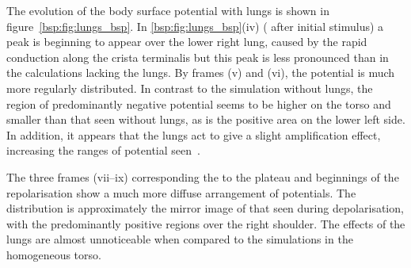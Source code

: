 The evolution of the body surface potential with lungs is shown in
figure~\ref{bsp:fig:lungs_bsp}.
In \ref{bsp:fig:lungs_bsp}(iv) ( after initial stimulus) a peak is
beginning to appear over the lower right lung, caused by the rapid conduction
along the crista terminalis but this peak is less pronounced than in the
calculations lacking the lungs.
By frames (v) and (vi), the potential is much more regularly distributed.
In contrast to the simulation without lungs, the region of predominantly
negative potential seems to be higher on the torso and smaller than that seen
without lungs, as is the positive area on the lower left side.
In addition, it appears that the lungs act to give a slight amplification
effect, increasing the ranges of potential seen~\cite{Gulrajani1983}.

The three frames (vii--ix) corresponding the to the plateau and beginnings of the
repolarisation show a much more diffuse arrangement of potentials.
The distribution is approximately the mirror image of that seen during
depolarisation, with the predominantly positive regions over the right shoulder.
The effects of the lungs are almost unnoticeable when compared to the
simulations in the homogeneous torso.

